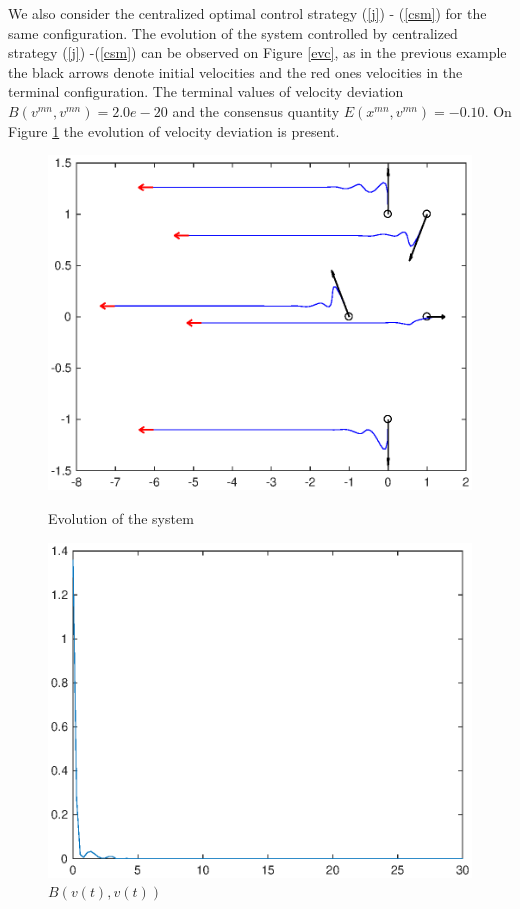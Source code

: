 \documentclass[a4paper,10pt, english]{article}
\begin{document}
We also consider the centralized optimal control strategy (\ref{j}) - (\ref{csm}) for the same configuration. The evolution of the system controlled by centralized strategy (\ref{j}) -(\ref{csm}) can be observed on Figure \ref{evc}, as in the previous example the black arrows denote initial velocities and the red ones velocities in the terminal configuration.  The terminal values 
of velocity deviation $B(v^{mn}, v^{mn}) = 2.0e-20$ and the consensus quantity  $E(x^{mn}, v^{mn}) = -0.10$. On Figure \ref{lfc} the evolution of velocity deviation is present.
\begin{figure}[ht]
  \begin{minipage}[b]{0.5\textwidth}
    \includegraphics[width=\textwidth]{figures/a5_C_ev.eps}
    \caption{Evolution of the system}
    \label{evc}
  \end{minipage}
  \hfill
  \begin{minipage}[b]{0.5\textwidth}
    \includegraphics[width=\textwidth]{figures/a5_C_lf.eps}
    \caption{$B(v(t), v(t))$ }
    \label{lfc}
  \end{minipage}
\end{figure}
\end{document}
